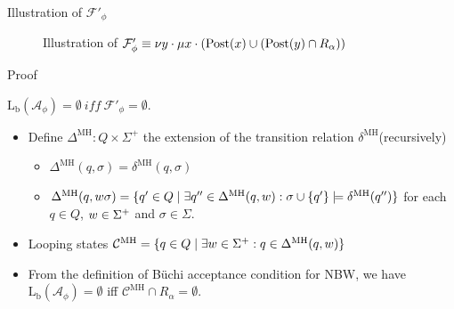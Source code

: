 \documentclass[12pt]{beamer}
\begin{document}
\begin{frame}{Illustration of $\mathcal{F}'_{\phi}$}
\begin{figure}[ht]
		  \caption{Illustration of $\mathcal{F}'_{\phi} \equiv \nu \mathnormal{y} \cdot \mu \mathnormal{x} \cdot (\text{Post}(\mathnormal{x}) \cup (\text{Post}(\mathnormal{y}) \cap R_{\alpha}))$}
	\end{figure}
\end{frame}

\begin{frame}{Proof}
	\begin{theorem}
		$\text{L}_{\text{b}}(\mathcal{A}_{\phi}) = \emptyset ~ iff ~ \mathcal{F}'_{\phi} = \emptyset$.
	\end{theorem}
	\begin{itemize}
		\item Define $\Delta^{\text{MH}} : Q \times \Sigma^{+}$ the extension of the transition relation $\delta^{\text{MH}}$(recursively)
		\begin{itemize}
			\item $\Delta^{\text{MH}}(q, \sigma) = \delta^{\text{MH}}(q, \sigma)$
			\item $\Delta^{\text{MH}}(q, \mathnormal{w}\sigma) = \{q' \in Q \mid \exists q'' \in \Delta^{\text{MH}}(q, \mathnormal{w}) : \sigma \cup \{q'\} \models \delta^{\text{MH}}(q'')\}$ for each $q \in Q$, $\mathnormal{w} \in \Sigma^{+}$ and $\sigma \in \Sigma$.
		\end{itemize}
		\item Looping states $\mathcal{C}^{\text{MH}} = \{q \in Q \mid \exists \mathnormal{w} \in \Sigma^{+} : q \in \Delta^{\text{MH}}(q,\mathnormal{w})\}$
		\item From the definition of Büchi acceptance condition for NBW, we have $\text{L}_{\text{b}}(\mathcal{A}_{\phi}) = \emptyset$ iff $\mathcal{C}^{\text{MH}} \cap R_{\alpha} = \emptyset$.
	\end{itemize}
\end{frame}
\end{document}
